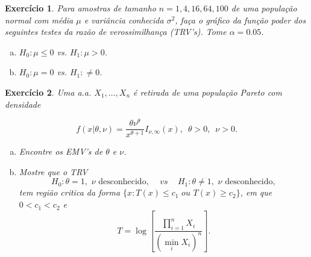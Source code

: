 \documentclass[letter,11pt]{article}
\newtheorem{exer}{Exercício}
\begin{document}
% 
% 
% 


% 
% 


\begin{exer} \rm  %
Para amostras de tamanho $n=1,4,16,64,100$ de uma população normal com média $\mu$ e variância conhecida $\sigma^2$, faça o gráfico da função poder dos seguintes testes da razão de verossimilhança (TRV's). Tome $\alpha=0.05$.
\begin{enumerate}[a)]
\item $H_0:\mu\leq 0$  vs. $H_1:\mu>0$.
\item $H_0:\mu= 0$  vs. $H_1:\neq 0$.
\end{enumerate}
\end{exer}


\begin{exer} \rm  %
 Uma a.a. $X_1,\ldots,X_n$ é retirada de uma população Pareto com densidade

$$f(x|\theta,\nu)=\frac{\theta\nu^\theta}{x^{\theta+1}}I_{\nu,\infty}(x),\,\,\,\theta>0,\,\,\,\nu>0.$$

\begin{enumerate}[a)]
\item Encontre os EMV's de $\theta$ e $\nu$.

\item Mostre que o TRV
$$H_0: \theta=1,\,\,\nu\,\,\mbox{desconhecido},\,\,\,\,\,\,\,vs\,\,\,\,\,\,\, H_1: \theta\neq 1,\,\,\nu\,\,\mbox{desconhecido},$$
tem região critica da forma $\{x:T(x)\leq c_1\,\,ou\,\,T(x)\geq c_2\}$, em que $0<c_1<c_2$ e $$T=\log \left[ \frac{\prod_{i=1}^{n}X_i}{(\min_i X_i)^n}\right].$$
\end{enumerate}
\end{exer}
\end{document}
